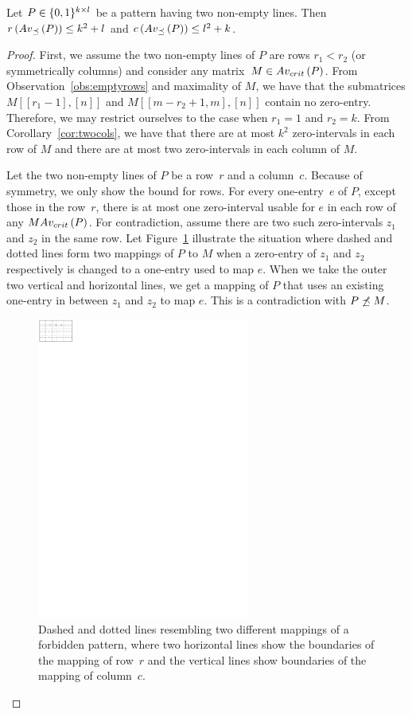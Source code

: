 \begin{lemma}
Let $P\in\{0,1\}^{k\times l}$ be a pattern having two non-empty lines. Then $r\left(Av_{\preceq}\left(P\right)\right)\leq k^2+l$ and $c\left(Av_{\preceq}\left(P\right)\right)\leq l^2+k$.
\end{lemma}
\begin{proof}
First, we assume the two non-empty lines of $P$ are rows $r_1<r_2$ (or symmetrically columns) and consider any matrix~$M\in Av_{crit}\left(P\right)$. From Observation~\ref{obs:emptyrows} and maximality of $M$, we have that the submatrices $M[[r_1-1],[n]]$ and $M[[m-r_2+1,m],[n]]$ contain no zero-entry. Therefore, we may restrict ourselves to the case when $r_1=1$ and $r_2=k$. From Corollary~\ref{cor:twocols}, we have that there are at most $k^2$ zero-intervals in each row of $M$ and there are at most two zero-intervals in each column of $M$.

Let the two non-empty lines of $P$ be a row~$r$ and a column~$c$. Because of symmetry, we only show the bound for rows. For every one-entry~$e$ of $P$, except those in the row~$r$, there is at most one zero-interval usable for $e$ in each row of any $MAv_{crit}\left(P\right)$. For contradiction, assume there are two such zero-intervals $z_1$ and $z_2$ in the same row. Let Figure~\ref{fig:twolines} illustrate the situation where dashed and dotted lines form two mappings of $P$ to $M$ when a zero-entry of $z_1$ and $z_2$ respectively is changed to a one-entry used to map $e$. When we take the outer two vertical and horizontal lines, we get a mapping of $P$ that uses an existing one-entry in between $z_1$ and $z_2$ to map $e$. This is a contradiction with $P\not\preceq M$.

\begin{figure}[!ht]
\centering
\includegraphics[width=70mm]{img/twolines.pdf}
\caption{Dashed and dotted lines resembling two different mappings of a forbidden pattern, where two horizontal lines show the boundaries of the mapping of row~$r$ and the vertical lines show boundaries of the mapping of column~$c$.}
\label{fig:twolines}
\end{figure}


\end{proof}
